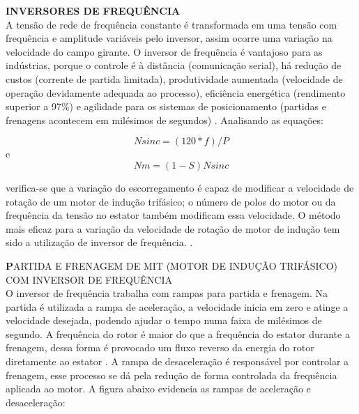 \vfill
\pagebreak

\textbf{INVERSORES DE FREQUÊNCIA}\\

A tensão de rede de frequência constante é transformada em uma tensão com frequência e amplitude variáveis pelo inversor,     assim ocorre uma variação na velocidade do campo girante. O inversor de frequência é vantajoso para as indústrias, porque o controle é à distância (comunicação serial), há redução de custos (corrente de partida limitada), produtividade aumentada (velocidade de operação devidamente adequada ao processo), eficiência energética (rendimento superior a 97\%) e agilidade para os sistemas de posicionamento (partidas e frenagens acontecem em milésimos de segundos) \cite{WEG2}.
    Analisando as equações:

    \begin{equation}\label{Rotação Sinc.}
            Nsinc=(120*f)/P
    \end{equation}
    e
    \begin{equation}\label{Rotação Sinc.}
     Nm=(1-S)Nsinc
    \end{equation}

     verifica-se que a variação do escorregamento é capaz de modificar a velocidade de rotação de um motor de indução trifásico; o número de polos do motor ou da frequência da tensão no estator também modificam essa velocidade. O método mais eficaz para a variação da velocidade de rotação de motor de indução tem sido a utilização de inversor de frequência. \cite{WEG2}.

     \textbf PARTIDA E FRENAGEM DE MIT (MOTOR DE INDUÇÃO TRIFÁSICO) COM INVERSOR DE FREQUÊNCIA\\

     O inversor de frequência trabalha com rampas para partida e frenagem. Na partida é utilizada a rampa de aceleração, a velocidade inicia em zero e atinge a velocidade desejada, podendo ajudar o tempo numa faixa de milésimos de segundo.
    A frequência do rotor é maior do que a frequência do estator durante a frenagem, dessa forma é provocado um fluxo reverso da energia do rotor diretamente ao estator \cite{covino}. A rampa de desaceleração é responsável por controlar a frenagem, esse processo se dá pela redução de forma controlada da frequência aplicada ao motor.
    A figura abaixo evidencia as rampas de aceleração e desaceleração:\\

